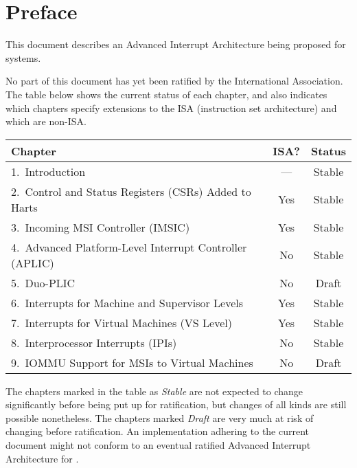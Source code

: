 
\chapter{Preface}

This document describes an Advanced Interrupt Architecture
being proposed for {\RISCV} systems.

No part of this document has yet been ratified
by the {\RISCV} International Association.
The table below shows the current status of each chapter,
and also indicates which chapters specify extensions to the
{\RISCV} ISA (instruction set architecture) and which are non-ISA.

{
\begin{table}[hbt]
\centering
\begin{tabular}{|l|c|c|}
\hline
Chapter                                                  & ISA? & Status \\
\hline
\hline
1.\ Introduction                                         & ---  & Stable \\
2.\ Control and Status Registers (CSRs) Added to Harts   & Yes  & Stable \\
3.\ Incoming MSI Controller (IMSIC)                      & Yes  & Stable \\
4.\ Advanced Platform-Level Interrupt Controller (APLIC) & No   & Stable \\
5.\ Duo-PLIC                                             & No   & Draft \\
6.\ Interrupts for Machine and Supervisor Levels         & Yes  & Stable \\
7.\ Interrupts for Virtual Machines (VS Level)           & Yes  & Stable \\
8.\ Interprocessor Interrupts (IPIs)                     & No   & Stable \\
9.\ IOMMU Support for MSIs to Virtual Machines           & No   & Draft \\
\hline
\end{tabular}
\end{table}
}

The chapters marked in the table as \emph{Stable} are not expected
to change significantly before being put up for ratification,
but changes of all kinds are still possible nonetheless.
The chapters marked \emph{Draft} are very much
at risk of changing before ratification.
An implementation adhering to the current document might not conform
to an eventual ratified Advanced Interrupt Architecture for {\RISCV}.

